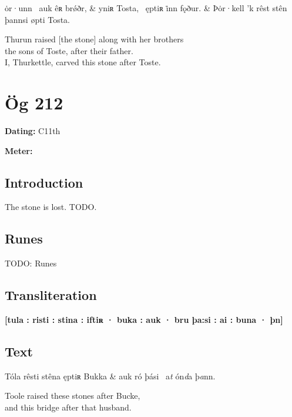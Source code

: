 \bvg\bva[]%
ȯr·unn  \hld\ auk êʀ brǿðr, &
yniʀ Tosta, \hld\ ęptiʀ i̇nn fǫður. &
Þȯr·kell ’k rêst stên þannsi øpti Tosta.\eva

\bvb Thurun raised [the stone] along with her brothers \\
the sons of Toste, after their father. \\
I, Thurkettle, carved this stone after Toste.\evb\evg

\sectionline\clearpage


\section{Ög 212}

\begin{flushright}%
\textbf{Dating:} C11th

\textbf{Meter:} \Fornyrdislag
\end{flushright}%

\subsection{Introduction}

The stone is lost. TODO.

\subsection{Runes}

TODO: Runes%

\subsection{Transliteration}

\textbf{[tula : risti : stina : iftiʀ · buka : auk · bru þa:si : ai : buna · þn]}

\subsection{Text}

\bvg\bva[]%
Tóla rêsti stêna ęptiʀ Bukka &
auk ró þási \hld\ a\emph{t} ón\emph{d}a þ\emph{a}nn.\eva

\bvb Toole raised these stones after Bucke, \\
and this bridge after that husband.\evb\evg

